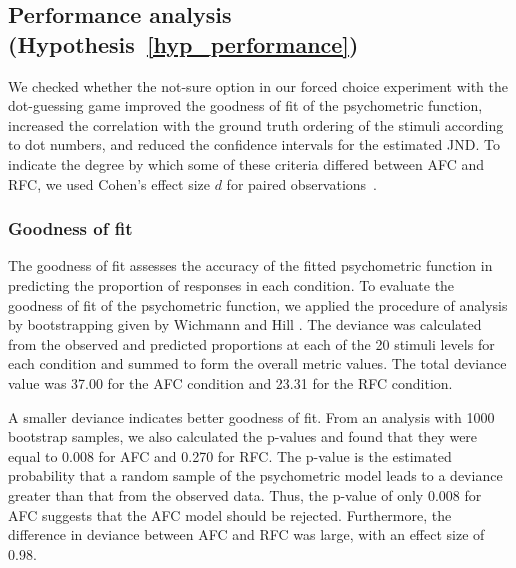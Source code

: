 \documentclass[a4paper,conference]{IEEEtran}
\begin{document}
\subsection{Performance analysis (Hypothesis~\ref{hyp_performance})}
We checked whether the not-sure option in our forced choice experiment with the dot-guessing game improved the goodness of fit of the psychometric function, increased the correlation with the ground truth ordering of the stimuli according to dot numbers, and reduced the confidence intervals for the estimated JND. To indicate the degree by which some of these criteria differed between AFC and RFC, we used Cohen's effect size $d$ for paired observations~\cite{lakens2013calculating}.

\subsubsection{Goodness of fit}
The goodness of fit assesses the accuracy of the fitted psychometric function in predicting the proportion of responses in each condition. To evaluate the goodness of fit of the psychometric function, we applied the procedure of analysis by bootstrapping given by Wichmann and Hill \cite{wichmann2001psychometric}. The deviance was calculated from the observed and predicted proportions at each of the 20 stimuli levels for each condition and summed to form the overall metric values. The total deviance value was 37.00 for the AFC condition and 23.31 for the RFC condition. 

A smaller deviance indicates  better goodness of fit. From an analysis with 1000 bootstrap samples, we also calculated the p-values and found that they were equal to 0.008 for AFC and 0.270 for RFC. The p-value is the estimated probability that a random sample of the psychometric model leads to a deviance greater than that from the observed data. Thus, the p-value of only 0.008 for AFC suggests that the AFC model should be rejected. Furthermore, the difference in deviance between AFC and RFC was large, with an effect size of 0.98.



\end{document}
